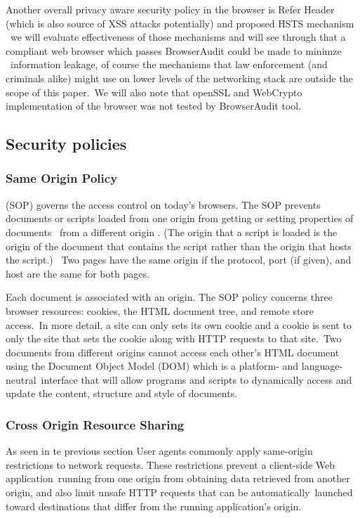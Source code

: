 \documentclass[a4paper,12pt]{paper}
\begin{document}
Another overall privacy aware security policy in the browser is Refer Header (which is also source of XSS attacks potentially) and proposed HSTS mechanism \
we will evaluate effectiveness of those mechanisms and will see through that a compliant web browser which passes BrowserAudit could be made to minimze \
information leakage, of course the mechanisms that law enforcement (and criminals alike) might use on lower levels of the networking stack are outside the scope of this paper.\
We will also note that openSSL and WebCrypto implementation of the browser was not tested by BrowserAudit tool.\


\subsection{Security policies}

\subsubsection{Same Origin Policy}

\label{SOP}
(SOP) governs the access control on today’s browsers. The SOP prevents documents or scripts loaded from one origin from getting or setting properties of documents \
from a different origin . (The origin that a script is loaded is the origin of the document that contains the script rather than the origin that hosts the script.) \
Two pages have the same origin if the protocol, port (if given), and host are the same for both pages.

Each document is associated with an origin. The SOP policy concerns three browser resources: cookies, the HTML document tree, and remote store access.\
In more detail, a site can only sets its own cookie and a cookie is sent to only the site that sets the cookie along with HTTP requests to that site.\
Two documents from different origins cannot access each other’s HTML document using the Document Object Model (DOM) which is a platform- and language-neutral\
interface that will allow programs and scripts to dynamically access and update the content, structure and style of documents.\\


\subsubsection{Cross Origin Resource Sharing}
\label{CORS}

As seen in te previous section User agents commonly apply same-origin restrictions to network requests. These restrictions prevent a client-side Web application\
running from one origin from obtaining data retrieved from another origin, and also limit unsafe HTTP requests that can be automatically\
launched toward destinations that differ from the running application's origin.\\
\end{document}
